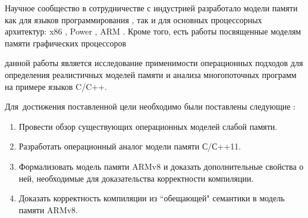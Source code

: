 
{\progress}
Научное сообщество в сотрудничестве с индустрией разработало модели
памяти как для языков программирования
\cite{Batty-al:POPL11, Manson-al:POPL05},
так и для основных процессорных архитектур: 
x86 \cite{Sewell-al:CACM10},
Power \cite{Sarkar-al:PLDI11,Alglave-al:TOPLAS14},
ARM \cite{Flur-al:POPL16}.
Кроме того, есть работы посвященные моделям памяти графических
процессоров 



{\aim} данной работы является исследование применимости операционных
подходов для определения реалистичных моделей памяти и анализа
многопоточных программ на примере языков C/C++.

Для~достижения поставленной цели необходимо были поставлены следующие {\tasks}:
\begin{enumerate}
  \item Провести обзор существующих операционных моделей слабой памяти.
  \item Разработать операционный аналог модели памяти С/С++11.
  \item Формализовать модель памяти ARMv8 и доказать дополнительные свойства о ней, необходимые для
        доказательства корректности компиляции. 
  \item Доказать корректность компиляции из ``обещающей" \; семантики в модель памяти ARMv8.
\end{enumerate}

